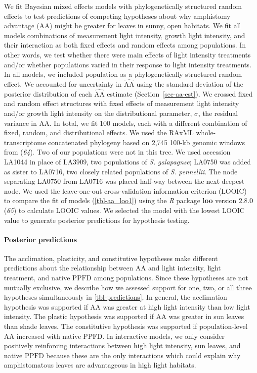 \documentclass[
  letterpaper,
  DIV=11,
  numbers=noendperiod]{scrartcl}
\let\oldparagraph\paragraph
\renewcommand{\paragraph}[1]{\oldparagraph{#1}\mbox{}}
\newcommand{\aax}{$\mathrm{AA}$}
\newcommand{\ppfd}{$\mathrm{PPFD}$}
\begin{document}
We fit Bayesian mixed effects models with phylogenetically structured
random effects to test predictions of competing hypotheses about why
amphistomy advantage (\aax) might be greater for leaves in sunny, open
habitats. We fit all models combinations of measurement light intensity,
growth light intensity, and their interaction as both fixed effects and
random effects among populations. In other words, we test whether there
were main effects of light intensity treatments and/or whether
populations varied in their response to light intensity treatments. In
all models, we included population as a phylogenetically structured
random effect. We accounted for uncertainty in \(\widehat{\mathrm{AA}}\)
using the standard deviation of the posterior distribution of each
\(\widehat{\mathrm{AA}}\) estimate (Section~\ref{sec-aa-est}). We
crossed fixed and random effect structures with fixed effects of
measurement light intensity and/or growth light intensity on the
distributional parameter, \(\sigma\), the residual variance in \aax{}.
In total, we fit 100 models, each with a different combination of fixed,
random, and distributional effects. We used the RAxML
whole-transcriptome concatenated phylogeny based on 2,745 100-kb genomic
windows from (\emph{64}). Two of our populations were not in this tree.
We used accession LA1044 in place of LA3909, two populations of \emph{S.
galapagnse}; LA0750 was added as sister to LA0716, two closely related
populations of \emph{S. pennellii}. The node separating LA0750 from
LA0716 was placed half-way between the next deepest node. We used the
leave-one-out cross-validation information criterion (LOOIC) to compare
the fit of models (\autoref{tbl-aa_loo1}) using the \emph{R} package
\textbf{loo} version 2.8.0 (\emph{65}) to calculate LOOIC values. We
selected the model with the lowest LOOIC value to generate posterior
predictions for hypothesis testing.

\paragraph{Posterior predictions}\label{sec-predictions}

The acclimation, plasticity, and constitutive hypotheses make different
predictions about the relationship between \aax{} and light intensity,
light treatment, and native \ppfd{} among populations. Since these
hypotheses are not mutually exclusive, we describe how we assessed
support for one, two, or all three hypotheses simultaneously in
\autoref{tbl-predictions}. In general, the acclimation hypothesis was
supported if \aax{} was greater at high light intensity than low light
intensity. The plastic hypothesis was supported if \aax{} was greater in
sun leaves than shade leaves. The constitutive hypothesis was supported
if population-level \aax{} increased with native \ppfd. In interactive
models, we only consider positively reinforcing interactions between
high light intensity, sun leaves, and native \ppfd{} because these are
the only interactions which could explain why amphistomatous leaves are
advantageous in high light habitats.
\end{document}
